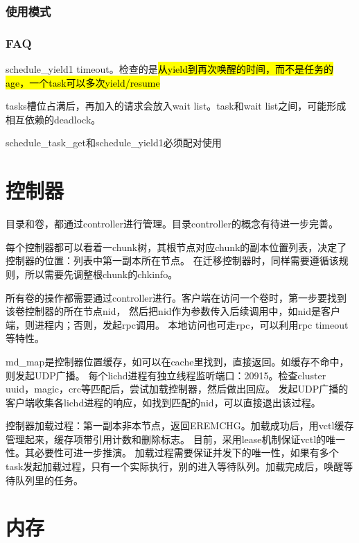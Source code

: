 \subsubsection{使用模式}

\subsubsection{FAQ}

\begin{compactenum}
\item schedule\_yield1 timeout。检查的是\hl{从yield到再次唤醒的时间，而不是任务的age，一个task可以多次yield/resume}
\item tasks槽位占满后，再加入的请求会放入wait list。task和wait list之间，可能形成相互依赖的deadlock。
\item schedule\_task\_get和schedule\_yield1必须配对使用
\end{compactenum}

\section{控制器}

目录和卷，都通过controller进行管理。目录controller的概念有待进一步完善。

每个控制器都可以看着一chunk树，其根节点对应chunk的副本位置列表，决定了控制器的位置：列表中第一副本所在节点。
在迁移控制器时，同样需要遵循该规则，所以需要先调整根chunk的chkinfo。

所有卷的操作都需要通过controller进行。客户端在访问一个卷时，第一步要找到该卷控制器的所在节点nid，
然后把nid作为参数传入后续调用中，如nid是客户端，则进程内；否则，发起rpc调用。
本地访问也可走rpc，可以利用rpc timeout等特性。

md\_map是控制器位置缓存，如可以在cache里找到，直接返回。如缓存不命中，则发起UDP广播。
每个lichd进程有独立线程监听端口：20915。检查cluster uuid，magic，crc等匹配后，尝试加载控制器，然后做出回应。
发起UDP广播的客户端收集各lichd进程的响应，如找到匹配的nid，可以直接退出该过程。

控制器加载过程：第一副本非本节点，返回EREMCHG。加载成功后，用vctl缓存管理起来，缓存项带引用计数和删除标志。
目前，采用lease机制保证vctl的唯一性。其必要性可进一步推演。
加载过程需要保证并发下的唯一性，如果有多个task发起加载过程，只有一个实际执行，别的进入等待队列。加载完成后，唤醒等待队列里的任务。

\section{内存}

